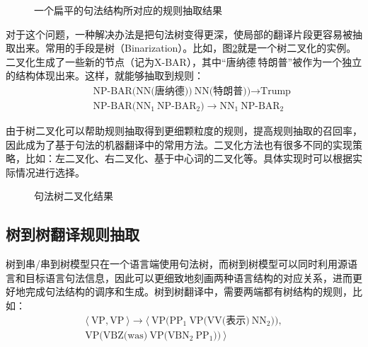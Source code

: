 \begin{figure}[htp]
\centering

\caption{一个扁平的句法结构所对应的规则抽取结果}
\label{fig:4-59}
\end{figure}

\parinterval 对于这个问题，一种解决办法是把句法树变得更深，使局部的翻译片段更容易被抽取出来。常用的手段是树{\small{}}（Binarization）。比如，图\ref{fig:4-60}就是一个树二叉化的实例。二叉化生成了一些新的节点（记为X-BAR），其中``唐纳德$\ $特朗普''被作为一个独立的结构体现出来。这样，就能够抽取到规则：
\begin{eqnarray}
&& \textrm{NP-BAR(NN(唐纳德))}\ \textrm{NN(特朗普))} \rightarrow \textrm{Trump} \nonumber \\
&& \textrm{NP-BAR(}\textrm{NN}_1\ \textrm{NP-}\textrm{BAR}_2) \rightarrow \textrm{NN}_1\ \textrm{NP-}\textrm{BAR}_2 \nonumber
\end{eqnarray}

\parinterval 由于树二叉化可以帮助规则抽取得到更细颗粒度的规则，提高规则抽取的召回率，因此成为了基于句法的机器翻译中的常用方法。二叉化方法也有很多不同的实现策略，比如：左二叉化\cite{DBLP:conf/naacl/ZhangHGK06}、右二叉化\cite{Tong2009Better}、基于中心词的二叉化\cite{DBLP:conf/acl/KleinM03,charniak2006multilevel}等。具体实现时可以根据实际情况进行选择。

\begin{figure}[htp]
\centering

\caption{句法树二叉化结果}
\label{fig:4-60}
\end{figure}


\subsection{树到树翻译规则抽取}

\parinterval 树到串/串到树模型只在一个语言端使用句法树，而树到树模型可以同时利用源语言和目标语言句法信息，因此可以更细致地刻画两种语言结构的对应关系，进而更好地完成句法结构的调序和生成。树到树翻译中，需要两端都有树结构的规则，比如：
\begin{eqnarray}
\langle\ \textrm{VP},\textrm{VP}\ \rangle \rightarrow \langle\ \textrm{VP(}\textrm{PP}_1\ \textrm{VP(VV(表示)}\ \textrm{NN}_2\textrm{))}, \nonumber \\
\textrm{VP(VBZ(was)}\ \textrm{VP(}\textrm{VBN}_2\ \textrm{PP}_1\textrm{))}\ \rangle \nonumber
\end{eqnarray}

